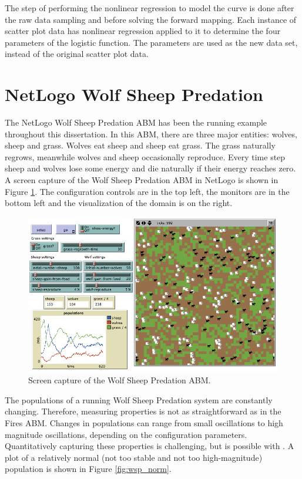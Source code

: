 The step of performing the nonlinear regression to model the curve is done after the raw data sampling and before solving the forward mapping.
Each instance of scatter plot data has nonlinear regression applied to it to determine the four parameters of the logistic function.
The parameters are used as the new data set, instead of the original scatter plot data.




 \section{NetLogo Wolf Sheep Predation}
The NetLogo Wolf Sheep Predation ABM has been the running example throughout this dissertation.
In this ABM, there are three major entities: wolves, sheep and grass.
Wolves eat sheep and sheep eat grass.
The grass naturally regrows, meanwhile wolves and sheep occasionally reproduce.
Every time step sheep and wolves lose some energy and die naturally if their energy reaches zero.
A screen capture of the Wolf Sheep Predation ABM in NetLogo is shown in Figure \ref{fig:wolfsheepss}.
The configuration controls are in the top left, the monitors are in the bottom left and the visualization of the domain is on the right.

\begin{figure}[ht]
\centering
\includegraphics[scale=.4]{images/wolfsheep_ss.png}
\caption{Screen capture of the Wolf Sheep Predation ABM.}
\label{fig:wolfsheepss}
\end{figure}

The populations of a running Wolf Sheep Predation system are constantly changing.
Therefore, measuring properties is not as straightforward as in the Fires ABM.
Changes in populations can range from small oscillations to high magnitude oscillations, depending on the configuration parameters.
Quantitatively capturing these properties is challenging, but is possible with \fw.
A plot of a relatively normal (not too stable and not too high-magnitude) population is shown in Figure \ref{fig:wsp_norm}.

